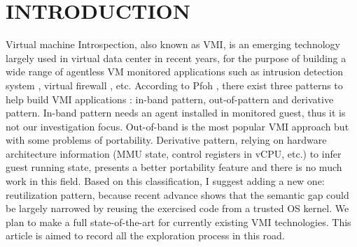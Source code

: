 
\chapter{INTRODUCTION} %

\label{Chapter1} %



Virtual machine Introspection, also known as VMI, is an emerging technology largely used in virtual data center in recent years, 
for the purpose of building a wide range of agentless VM monitored applications such as intrusion detection system \cite{Reference1}, 
virtual firewall \cite{Reference2}, etc. According to Pfoh \cite{Reference5}, there exist three patterns to help build VMI applications
: in-band pattern, out-of-pattern and derivative pattern. In-band pattern needs an agent installed in monitored guest, thus it is not our 
investigation focus. Out-of-band is the most popular VMI approach but with some problems of portability.    Derivative pattern, relying on 
hardware architecture information (MMU state, control registers in vCPU, etc.) to infer guest running state, presents a better portability 
feature and there is no much work in this field. Based on this classification, I suggest adding a new one: reutilization pattern, because 
recent advance shows that the semantic gap could be largely narrowed by reusing the exercised code from a trusted OS kernel. We plan to make 
a full state-of-the-art for currently existing VMI technologies. This article is aimed to record all the exploration process in this road.

